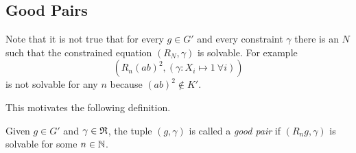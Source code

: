 \documentclass[a4paper,11pt]{amsart}
\begin{document}
\subsection{Good Pairs}\label{sec:good_pairs}
Note that 
 it is not true that for every $g\in G'$ and every constraint $\gamma$ 
 there is an $N$ such that the constrained equation $(R_N,\gamma)$ is solvable. For example 
 \[\left(R_n(ab)^2,(\gamma\colon X_i\mapsto 1\ \forall i)\right)\] 
 is not solvable for any $n$ because $(ab)^2\notin K'$.

This motivates the following definition.
\begin{defi}
Given $g\in G'$ and $\gamma\in\mathfrak{R}$, the tuple $(g,\gamma)$ is called a \emph{good pair} if 
$(R_ng,\gamma)$ is solvable for some $n\in\mathbb{N}$.  
\end{defi}
\end{document}
